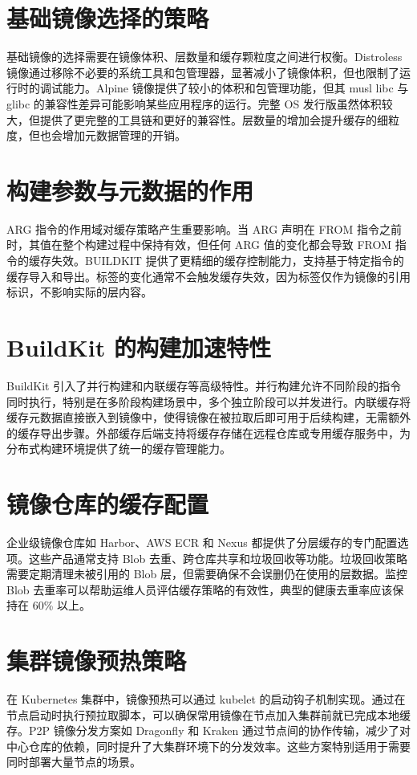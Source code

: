 \chapter{基础镜像选择的策略}
基础镜像的选择需要在镜像体积、层数量和缓存颗粒度之间进行权衡。Distroless 镜像通过移除不必要的系统工具和包管理器，显著减小了镜像体积，但也限制了运行时的调试能力。Alpine 镜像提供了较小的体积和包管理功能，但其 musl libc 与 glibc 的兼容性差异可能影响某些应用程序的运行。完整 OS 发行版虽然体积较大，但提供了更完整的工具链和更好的兼容性。层数量的增加会提升缓存的细粒度，但也会增加元数据管理的开销。\par
\chapter{构建参数与元数据的作用}
ARG 指令的作用域对缓存策略产生重要影响。当 ARG 声明在 FROM 指令之前时，其值在整个构建过程中保持有效，但任何 ARG 值的变化都会导致 FROM 指令的缓存失效。BUILDKIT 提供了更精细的缓存控制能力，支持基于特定指令的缓存导入和导出。标签的变化通常不会触发缓存失效，因为标签仅作为镜像的引用标识，不影响实际的层内容。\par
\chapter{BuildKit 的构建加速特性}
BuildKit 引入了并行构建和内联缓存等高级特性。并行构建允许不同阶段的指令同时执行，特别是在多阶段构建场景中，多个独立阶段可以并发进行。内联缓存将缓存元数据直接嵌入到镜像中，使得镜像在被拉取后即可用于后续构建，无需额外的缓存导出步骤。外部缓存后端支持将缓存存储在远程仓库或专用缓存服务中，为分布式构建环境提供了统一的缓存管理能力。\par
\chapter{镜像仓库的缓存配置}
企业级镜像仓库如 Harbor、AWS ECR 和 Nexus 都提供了分层缓存的专门配置选项。这些产品通常支持 Blob 去重、跨仓库共享和垃圾回收等功能。垃圾回收策略需要定期清理未被引用的 Blob 层，但需要确保不会误删仍在使用的层数据。监控 Blob 去重率可以帮助运维人员评估缓存策略的有效性，典型的健康去重率应该保持在 60\%{} 以上。\par
\chapter{集群镜像预热策略}
在 Kubernetes 集群中，镜像预热可以通过 kubelet 的启动钩子机制实现。通过在节点启动时执行预拉取脚本，可以确保常用镜像在节点加入集群前就已完成本地缓存。P2P 镜像分发方案如 Dragonfly 和 Kraken 通过节点间的协作传输，减少了对中心仓库的依赖，同时提升了大集群环境下的分发效率。这些方案特别适用于需要同时部署大量节点的场景。\par
